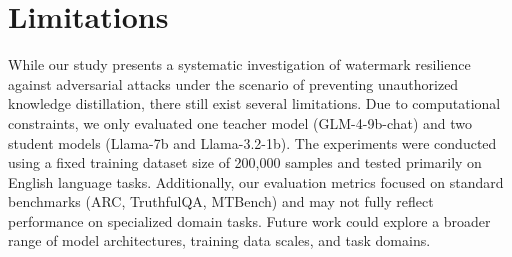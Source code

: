 \section*{Limitations}
While our study presents a systematic investigation of watermark resilience against adversarial attacks under the scenario of preventing unauthorized knowledge distillation, there still exist several limitations. Due to computational constraints, we only evaluated one teacher model (GLM-4-9b-chat) and two student models (Llama-7b and Llama-3.2-1b). The experiments were conducted using a fixed training dataset size of 200,000 samples and tested primarily on English language tasks. Additionally, our evaluation metrics focused on standard benchmarks (ARC, TruthfulQA, MTBench) and may not fully reflect performance on specialized domain tasks. Future work could explore a broader range of model architectures, training data scales, and task domains.